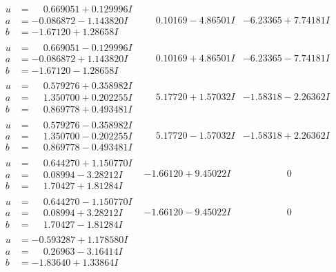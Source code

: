 \documentclass[1p]{elsarticle_modified}
\theoremstyle{definition}
\begin{document}
$$\begin{array}{c|c|c}
\begin{aligned}
u &= \phantom{-}0.669051 + 0.129996 I \\
a &= -0.086872 - 1.143820 I \\
b &= -1.67120 + 1.28658 I\end{aligned}
 & \phantom{-}0.10169 - 4.86501 I & -6.23365 + 7.74181 I \\ \hline\begin{aligned}
u &= \phantom{-}0.669051 - 0.129996 I \\
a &= -0.086872 + 1.143820 I \\
b &= -1.67120 - 1.28658 I\end{aligned}
 & \phantom{-}0.10169 + 4.86501 I & -6.23365 - 7.74181 I \\ \hline\begin{aligned}
u &= \phantom{-}0.579276 + 0.358982 I \\
a &= \phantom{-}1.350700 + 0.202255 I \\
b &= \phantom{-}0.869778 + 0.493481 I\end{aligned}
 & \phantom{-}5.17720 + 1.57032 I & -1.58318 - 2.26362 I \\ \hline\begin{aligned}
u &= \phantom{-}0.579276 - 0.358982 I \\
a &= \phantom{-}1.350700 - 0.202255 I \\
b &= \phantom{-}0.869778 - 0.493481 I\end{aligned}
 & \phantom{-}5.17720 - 1.57032 I & -1.58318 + 2.26362 I \\ \hline\begin{aligned}
u &= \phantom{-}0.644270 + 1.150770 I \\
a &= \phantom{-}0.08994 - 3.28212 I \\
b &= \phantom{-}1.70427 + 1.81284 I\end{aligned}
 & -1.66120 + 9.45022 I & \phantom{-0.000000 } 0 \\ \hline\begin{aligned}
u &= \phantom{-}0.644270 - 1.150770 I \\
a &= \phantom{-}0.08994 + 3.28212 I \\
b &= \phantom{-}1.70427 - 1.81284 I\end{aligned}
 & -1.66120 - 9.45022 I & \phantom{-0.000000 } 0 \\ \hline\begin{aligned}
u &= -0.593287 + 1.178580 I \\
a &= \phantom{-}0.26963 - 3.16414 I \\
b &= -1.83640 + 1.33864 I\end{aligned}

\end{array}$$
\end{document}
